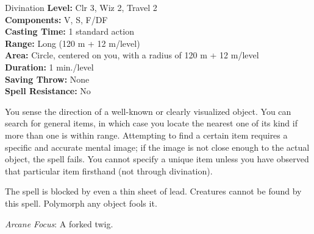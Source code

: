 {Divination}
{
	\textbf{Level:}
	Clr 3, Wiz 2, Travel 2\\
	\textbf{Components:}
	V, S, F/DF\\
	\textbf{Casting Time:}
	1 standard action\\
	\textbf{Range:}
	Long (120 m + 12 m/level)\\
	\textbf{Area:}
	Circle, centered on you, with a radius of 120 m + 12 m/level\\
	\textbf{Duration:}
	1 min./level\\
	\textbf{Saving Throw:}
	None\\
	\textbf{Spell Resistance:}
	No\\
}
{
	You sense the direction of a well-known or clearly visualized object. You can search for general items, in which case you locate the nearest one of its kind if more than one is within range. Attempting to find a certain item requires a specific and accurate mental image; if the image is not close enough to the actual object, the spell fails. You cannot specify a unique item unless you have observed that particular item firsthand (not through divination).

	The spell is blocked by even a thin sheet of lead. Creatures cannot be found by this spell. Polymorph any object fools it.

	\textit{Arcane Focus}:
	A forked twig.

}
